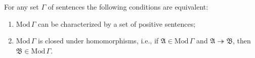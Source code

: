 For any set $\Gamma$ of sentences the following conditions are equivalent:

\begin{enumerate}
\item[(i)] $\mathrm{Mod}\,\Gamma$ can be characterized by a set of positive sentences;
\item[(ii)] $\mathrm{Mod}\,\Gamma$ is closed under homomorphisms, i.e., if $\mathfrak{A} \in \mathrm{Mod}\,\Gamma$ and $\mathfrak{A} \twoheadrightarrow \mathfrak{B}$, then $\mathfrak{B} \in \mathrm{Mod}\,\Gamma$.
\end{enumerate}
